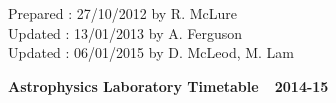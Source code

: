 \documentclass[12pt]{article}
\begin{document}
{\vspace*{2cm}


\noindent
Prepared : 27/10/2012 by R. McLure\\
Updated : 13/01/2013 by A. Ferguson\\
Updated : 06/01/2015 by D. McLeod, M. Lam
}

\newpage



\begin{center}
{\Large {\bf Astrophysics Laboratory Timetable\ \ 2014-15}}\\
\end{center}

\medskip
\end{document}
